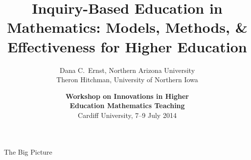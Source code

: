 \documentclass[10pt]{beamer}
\begin{document}


\title[Inquiry-Based Education in Mathematics]
{\large \textbf{Inquiry-Based Education in Mathematics: Models, Methods, \& Effectiveness for Higher Education}}
\author[D.C.~Ernst and TJ Hitchman]{Dana C.~Ernst, Northern Arizona University\\
Theron Hitchman, University of Northern Iowa}

\vspace{1em}

\date{\textbf{Workshop on Innovations in Higher\\ Education Mathematics Teaching}\\
Cardiff University, 7--9 July 2014}

\frame{\titlepage}


\begin{frame}

\vfill
\begin{center}
\end{center}
\vfill

\end{frame}


\begin{frame}

\begin{block}{The Big Picture}

\vspace{1em}

\end{block}

\end{frame}

\end{document}

